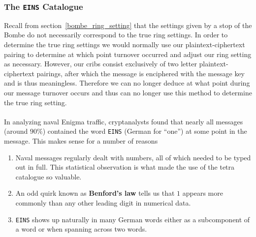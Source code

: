 \subsubsection{The \texttt{EINS} Catalogue}
Recall from section~\ref{bombe_ring_setting} that the settings given by a stop of the Bombe do not necessarily correspond to the true ring settings. In order to determine the true ring settings we would normally use our plaintext-ciphertext pairing to determine at which point turnover occurred and adjust our ring setting as necessary. However, our cribs consist exclusively of two letter plaintext-ciphertext pairings, after which the message is enciphered with the message key and is thus meaningless. Therefore we can no longer deduce at what point during our message turnover occurs and thus can no longer use this method to determine the true ring setting.
\\\\In analyzing naval Enigma traffic, cryptanalysts found that nearly all messages (around $90\%$) contained the word \texttt{EINS} (German for ``one'') at some point in the message. This makes sense for a number of reasons
\begin{enumerate}
	\item Naval messages regularly dealt with numbers, all of which needed to be typed out in full. This statistical observation is what made the use of the tetra catalogue so valuable.
	\item An odd quirk known as {\bf{Benford's law}} tells us that $1$ appears more commonly than any other leading digit in numerical data.
	\item \texttt{EINS} shows up naturally in many German words either as a subcomponent of a word or when spanning across two words.
\end{enumerate}

